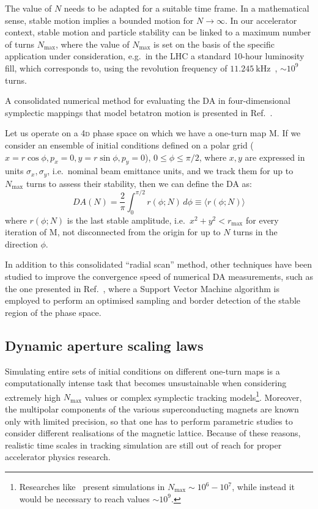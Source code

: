 The value of \(N\) needs to be adapted for a suitable time frame. In a mathematical sense, stable motion implies a bounded motion for \(N\rightarrow\infty\). In our accelerator context, stable motion and particle stability can be linked to a maximum number of turns \(N_{\text{max}}\), where the value of \(N_{\text{max}}\) is set on the basis of the specific application under consideration, e.g.\ in the LHC a standard 10-hour luminosity fill, which corresponds to, using the revolution frequency of \(\SI{11.245}{\kHz}\)~\cite{Benedikt:823808}, \(\sim 10^9\) turns.

A consolidated numerical method for evaluating the DA in four-dimensional symplectic mappings that model betatron motion is presented in Ref.~\cite{PhysRevE.53.4067}.

Let us operate on a 4\textsc{d} phase space on which we have a one-turn map \(\mathrm{M}\). If we consider an ensemble of initial conditions defined on a polar grid (\(x=r\cos\phi, p_x=0, y=r\sin\phi, p_y=0\)), \(0\leq\phi\leq\pi/2\), where \(x,y\) are expressed in units \(\sigma_x, \sigma_y\), i.e.\ nominal beam emittance units, and we track them for up to \(N_{\text{max}}\) turns to assess their stability, then we can define the DA as:
\begin{equation}
	DA(N) = \frac{2}{\pi}\int_0^{\pi/2} r(\phi;N)\,d\phi \equiv \langle r(\phi;N)\rangle
	\label{eq:dynamic_aperture_numerical}
\end{equation}
where \(r(\phi;N)\) is the last stable amplitude, i.e.\ \(x^2 + y^2 < r_{\mathrm{max}}\) for every iteration of \(\mathrm{M}\), not disconnected from the origin for up to \(N\) turns in the direction \(\phi\). %

In addition to this consolidated ``radial scan'' method, other techniques have been studied to improve the convergence speed of numerical DA measurements, such as the one presented in Ref.~\cite{vanderveken:ipac2022-mopost047}, where a Support Vector Machine algorithm is employed to perform an optimised sampling and border detection of the stable region of the phase space.

\subsection{Dynamic aperture scaling laws}

Simulating entire sets of initial conditions on different one-turn maps is a computationally intense task that becomes unsustainable when considering extremely high \(N_{\text{max}}\) values or complex symplectic tracking models\footnote{Researches like~\cite{invlog} present simulations in $N_\text{max}\sim 10^6-10^7$, while instead it would be necessary to reach values \(\sim 10^9\).}. Moreover, the multipolar components of the various superconducting magnets are known only with limited precision, so that one has to perform parametric studies to consider different realisations of the magnetic lattice. Because of these reasons, realistic time scales in tracking simulation are still out of reach for proper accelerator physics research.

